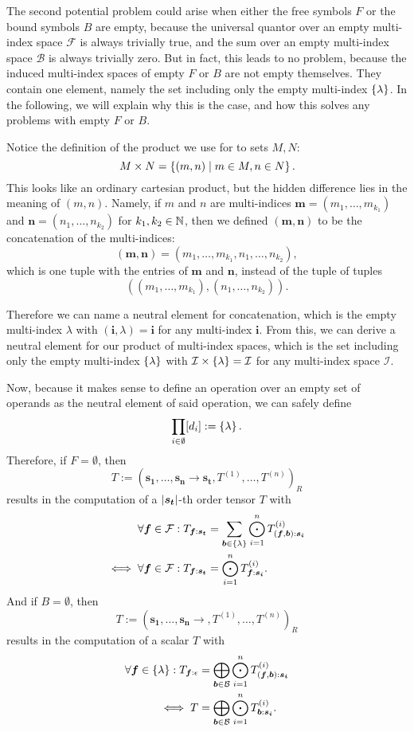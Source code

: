 The second potential problem could arise when either the free symbols $F$ or the bound symbols $B$ are empty,
because the universal quantor over an empty multi-index space $\mathcal{F}$ is always trivially true, and the sum over an empty multi-index space $\mathcal{B}$ is always trivially zero.
But in fact, this leads to no problem, because the induced multi-index spaces of empty $F$ or $B$ are not empty themselves.
They contain one element, namely the set including only the empty multi-index $\lbrace \lambda \rbrace$.
In the following, we will explain why this is the case, and how this solves any problems with empty $F$ or $B$.

Notice the definition of the product we use for to sets $M, N$:
$$M \times N = \left\lbrace (m, n) \mid m \in M, n \in N \right\rbrace.$$
This looks like an ordinary cartesian product, but the hidden difference lies in the meaning of $(m,n)$.
Namely, if $m$ and $n$ are multi-indices $\bm{m} = (m_1, \dots, m_{k_1})$ and $\bm{n} = (n_1, \dots, n_{k_2})$ for $k_1, k_2 \in \mathbb{N}$, then we defined $(\bm{m}, \bm{n})$ to be the concatenation of the multi-indices:
$$(\bm{m}, \bm{n}) = (m_1, \dots, m_{k_1}, n_1, \dots, n_{k_2}),$$
which is one tuple with the entries of $\bm{m}$ and $\bm{n}$, instead of the tuple of tuples
$$((m_1, \dots, m_{k_1}), (n_1, \dots, n_{k_2})).$$

Therefore we can name a neutral element for concatenation, which is the empty multi-index $\lambda$ with $(\bm{i}, \lambda) = \bm{i}$ for any multi-index $\bm{i}$.
From this, we can derive a neutral element for our product of multi-index spaces, which is the set including only the empty multi-index $\lbrace \lambda \rbrace$ with $\mathcal{I} \times \lbrace \lambda \rbrace = \mathcal{I}$ for any multi-index space $\mathcal{I}$.

Now, because it makes sense to define an operation over an empty set of operands as the neutral element of said operation, we can safely define
$$\prod\limits_{i \in \emptyset} [d_i] := \left\lbrace \lambda \right\rbrace.$$
Therefore, if $F = \emptyset$, then
$$T := (\bm{s_1},\dots,\bm{s_n} \rightarrow \bm{s_t}, T^{(1)},\dots,T^{(n)})_R$$
results in the computation of a $\left\lvert \bm{s_t} \right\rvert$-th order tensor $T$ with
\begin{align*}
    \forall \bm{f} \in \mathcal{F}: T_{\bm{f}: \bm{s_t}} &= \sum\limits_{\bm{b} \in \lbrace \lambda \rbrace} \bigodot\limits_{i = 1}^{n} T^{(i)}_{(\bm{f},\bm{b}):\bm{s_i}}\\
    \iff \forall \bm{f} \in \mathcal{F}: T_{\bm{f}: \bm{s_t}} &= \bigodot\limits_{i = 1}^{n} T^{(i)}_{\bm{f}:\bm{s_i}}.
\end{align*}
And if $B = \emptyset$, then
$$T := (\bm{s_1},\dots,\bm{s_n} \rightarrow , T^{(1)},\dots,T^{(n)})_R$$
results in the computation of a scalar $T$ with
\begin{align*}
    \forall \bm{f} \in \lbrace \lambda \rbrace: T_{\bm{f}: \epsilon} &= \bigoplus\limits_{\bm{b} \in \mathcal{B}} \bigodot\limits_{i = 1}^{n} T^{(i)}_{(\bm{f},\bm{b}):\bm{s_i}}\\
    \iff T &= \bigoplus\limits_{\bm{b} \in \mathcal{B}} \bigodot\limits_{i = 1}^{n} T^{(i)}_{\bm{b}:\bm{s_i}}.
\end{align*}